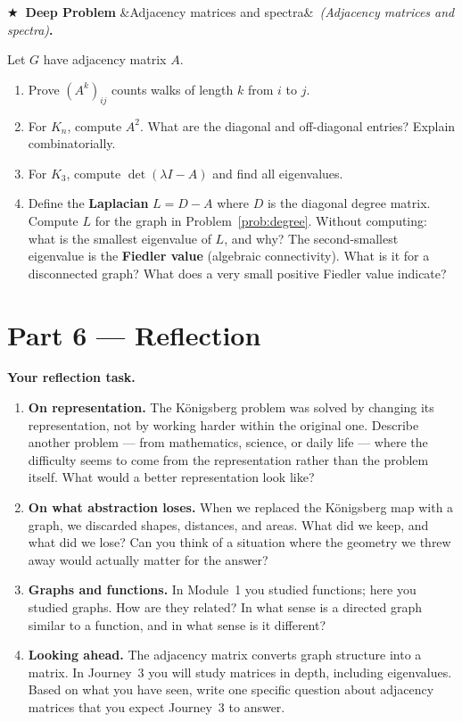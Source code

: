 \documentclass[12pt, a4paper]{article}
\newcounter{problem}
\newcounter{deepproblem}
\newenvironment{deepproblem}[1][]{%
  \refstepcounter{deepproblem}%
  \par\vspace{6pt}%
  \noindent\textbf{\color{NavyBlue}$\bigstar$\ Deep Problem \thedeepproblem}%
  \ifx&#1&\else\ \textit{(#1)}\fi\textbf{.}\enskip
}{\par\vspace{4pt}}
\begin{document}
\begin{deepproblem}[Adjacency matrices and spectra]
Let $G$ have adjacency matrix $A$.
\begin{enumerate}[label=(\alph*)]
  \item Prove $(A^k)_{ij}$ counts walks of length $k$ from $i$ to $j$.
  \item For $K_n$, compute $A^2$. What are the diagonal and off-diagonal entries? Explain combinatorially.
  \item For $K_3$, compute $\det(\lambda I - A)$ and find all eigenvalues.
  \item Define the \textbf{Laplacian} $L = D - A$ where $D$ is the diagonal degree matrix. Compute $L$ for the graph in Problem~\ref{prob:degree}. Without computing: what is the smallest eigenvalue of $L$, and why? The second-smallest eigenvalue is the \textbf{Fiedler value} (algebraic connectivity). What is it for a disconnected graph? What does a very small positive Fiedler value indicate?
\end{enumerate}
\end{deepproblem}

\section{Part 6 --- Reflection}

\begin{reflectionbox}
\textbf{Your reflection task.}

\begin{enumerate}
  \item \textbf{On representation.} The K\"{o}nigsberg problem was solved by changing its representation, not by working harder within the original one. Describe another problem --- from mathematics, science, or daily life --- where the difficulty seems to come from the representation rather than the problem itself. What would a better representation look like?

  \item \textbf{On what abstraction loses.} When we replaced the K\"{o}nigsberg map with a graph, we discarded shapes, distances, and areas. What did we keep, and what did we lose? Can you think of a situation where the geometry we threw away would actually matter for the answer?

  \item \textbf{Graphs and functions.} In Module~1 you studied functions; here you studied graphs. How are they related? In what sense is a directed graph similar to a function, and in what sense is it different?

  \item \textbf{Looking ahead.} The adjacency matrix converts graph structure into a matrix. In Journey~3 you will study matrices in depth, including eigenvalues. Based on what you have seen, write one specific question about adjacency matrices that you expect Journey~3 to answer.
\end{enumerate}
\end{reflectionbox}
\end{document}
